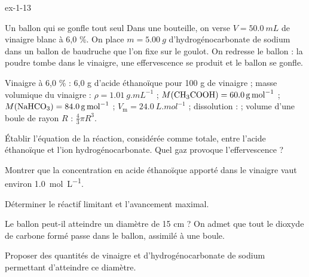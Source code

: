 \begin{blocLivre}{ex-1-13}
\begin{exercice}[3]{Un ballon qui se gonfle tout seul}
Dans une bouteille, on verse $V=\qty{50,0}{mL}$ de vinaigre blanc à 6,0 \%. On place $m=\qty{5,00}{g}$
d'hydrogénocarbonate de sodium  dans un ballon de baudruche que l'on fixe sur le goulot.
On redresse le ballon : la poudre tombe dans le vinaigre, une effervescence se produit et le ballon se gonfle.
\begin{donnees}
Vinaigre à 6,0 \% : 6,0 g d'acide éthanoïque  pour 100 g de vinaigre ; masse volumique du vinaigre :
$\rho=\qty{1,01}{g.mL^{-1}}$ ; $M(\ce{CH3COOH})=\qty{60,0}{g.mol^{-1}}$ ; $M(\ce{NaHCO3})=\qty{84,0}{g.mol^{-1}}$ ;
$V_\mathrm{m}=\qty{24,0}{L.mol^{-1}}$ ; dissolution :  ;
volume d'une boule de rayon $R$ : $\frac43\pi R^3$.
\end{donnees}
\begin{questions}
\item Établir l'équation de la réaction, considérée comme totale, entre l'acide éthanoïque et l'ion
hydrogénocarbonate. Quel gaz provoque l'effervescence ?
\item Montrer que la concentration en acide éthanoïque apporté dans le vinaigre vaut environ \qty{1,0}{mol.L^{-1}}.
\item Déterminer le réactif limitant et l'avancement maximal.
\item \initiative Le ballon peut-il atteindre un diamètre de 15 cm ? On admet que tout le dioxyde de carbone
formé passe dans le ballon, assimilé à une boule.
\item Proposer des quantités de vinaigre et d'hydrogénocarbonate de sodium permettant d'atteindre ce diamètre.
\end{questions}
\end{exercice}
\end{blocLivre}
